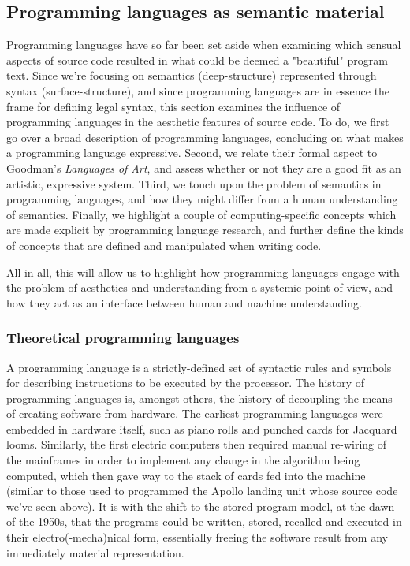\subsection{Programming languages as semantic material}
\label{subsec:programming-languages-semantic-material}

Programming languages have so far been set aside when examining which sensual aspects of source code resulted in what could be deemed a "beautiful" program text. Since we're focusing on semantics (deep-structure) represented through syntax (surface-structure), and since programming languages are in essence the frame for defining legal syntax, this section examines the influence of programming languages in the aesthetic features of source code. To do, we first go over a broad description of programming languages, concluding on what makes a programming language expressive. Second, we relate their formal aspect to Goodman's \emph{Languages of Art}, and assess whether or not they are a good fit as an artistic, expressive system. Third, we touch upon the problem of semantics in programming languages, and how they might differ from a human understanding of semantics. Finally, we highlight a couple of computing-specific concepts which are made explicit by programming language research, and further define the kinds of concepts that are defined and manipulated when writing code.

All in all, this will allow us to highlight how programming languages engage with the problem of aesthetics and understanding from a systemic point of view, and how they act as an interface between human and machine understanding.

\subsubsection{Theoretical programming languages}
\label{subsubsec:theoretical-programming-languages}

A programming language is a strictly-defined set of syntactic rules and symbols for describing instructions to be executed by the processor. The history of programming languages is, amongst others, the history of decoupling the means of creating software from hardware. The earliest programming languages were embedded in hardware itself, such as piano rolls and punched cards for Jacquard looms. Similarly, the first electric computers then required manual re-wiring of the mainframes in order to implement any change in the algorithm being computed, which then gave way to the stack of cards fed into the machine (similar to those used to programmed the Apollo landing unit whose source code we've seen above). It is with the shift to the stored-program model, at the dawn of the 1950s, that the programs could be written, stored, recalled and executed in their electro(-mecha)nical form, essentially freeing the software result from any immediately material representation.


